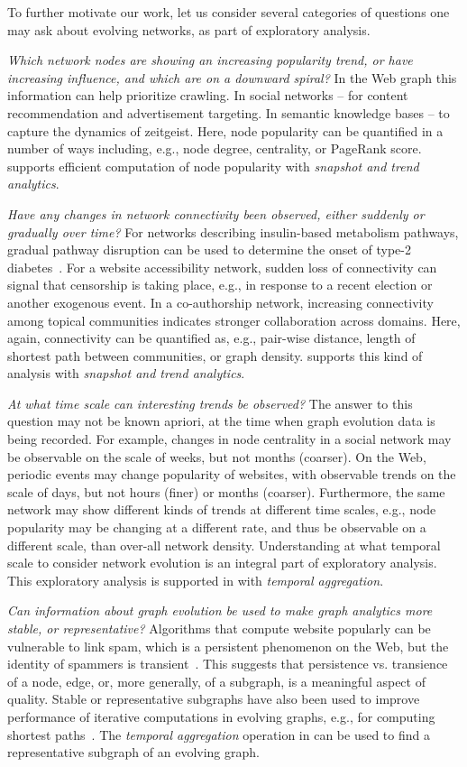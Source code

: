 To further motivate our work, let us consider several categories of
questions one may ask about evolving networks, as part of exploratory
analysis.

{\em Which network nodes are showing an increasing popularity trend,
  or have increasing influence, and which are on a downward spiral?}
In the Web graph this information can help prioritize crawling.  In
social networks -- for content recommendation and advertisement
targeting.  In semantic knowledge bases -- to capture the dynamics of
zeitgeist.  Here, node popularity can be quantified in a number of
ways including, e.g., node degree, centrality, or PageRank score.  \ql
supports efficient computation of node popularity with {\em snapshot
  and trend analytics}.

{\em Have any changes in network connectivity been observed, either
  suddenly or gradually over time?}  For networks describing
insulin-based metabolism pathways, gradual pathway disruption can be
used to determine the onset of type-2
diabetes~\cite{DBLP:journals/tcsb/BeyerTLSF10}.  For a website
accessibility network, sudden loss of connectivity can signal that
censorship is taking place, e.g., in response to a recent election or
another exogenous event.  In a co-authorship network, increasing
connectivity among topical communities indicates stronger
collaboration across domains.  Here, again, connectivity can be
quantified as, e.g., pair-wise distance, length of shortest path
between communities, or graph density.  \ql supports this kind of
analysis with {\em snapshot and trend analytics}.

{\em At what time scale can interesting trends be observed?} The
answer to this question may not be known apriori, at the time when
graph evolution data is being recorded.  For example, changes in node
centrality in a social network may be observable on the scale of
weeks, but not months (coarser).  On the Web, periodic events may
change popularity of websites, with observable trends on the scale of
days, but not hours (finer) or months (coarser).  Furthermore, the
same network may show different kinds of trends at different time
scales, e.g., node popularity may be changing at a different rate, and
thus be observable on a different scale, than over-all network
density.  Understanding at what temporal scale to consider network
evolution is an integral part of exploratory analysis.  This
exploratory analysis is supported in \ql with {\em temporal
  aggregation}.

{\em Can information about graph evolution be used to make graph
  analytics more stable, or representative?}  Algorithms that compute
website popularly can be vulnerable to link spam, which is a
persistent phenomenon on the Web, but the identity of spammers is
transient~\cite{DBLP:conf/cikm/YangQZGL07}.  This suggests that
persistence vs. transience of a node, edge, or, more generally, of a
subgraph, is a meaningful aspect of quality.  Stable or representative
subgraphs have also been used to improve performance of iterative
computations in evolving graphs, e.g., for computing shortest
paths~\cite{Ren2011}.  The {\em temporal aggregation} operation in
\ql {}can be used to find a
representative subgraph of an evolving graph.

